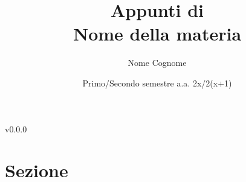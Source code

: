 \documentclass{article}
\title{{\large Appunti di} \\ \vspace{4 pt} {\Huge Nome della materia}\\ \vspace{2 pt}{dalle lezioni di Nome del professore}}
\author{Nome Cognome}
\date{Primo/Secondo semestre a.a. 2x/2(x+1)}
\begin{document}
\maketitle
\begin{center}
	v0.0.0
\end{center}
\newpage

\tableofcontents

\section{Sezione}
\end{document}
